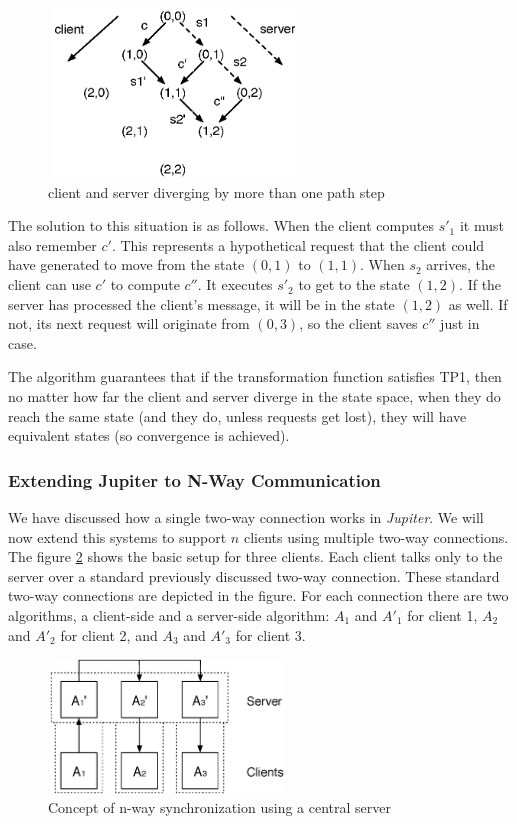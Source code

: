 \begin{figure}[htb]
 \centering
 \includegraphics[width=6.71cm,height=4.5cm]{../images/finalreport/algorithm_statespace2.eps}
 \caption{client and server diverging by more than one path step}
 \label{fig:algorithm.statespace2}
\end{figure}

The solution to this situation is as follows. When the client computes $s'_1$ it 
must also remember $c'$. This represents a hypothetical request that the client 
could have generated to move from the state $(0,1)$ to $(1,1)$. When $s_2$
arrives, the client can use $c'$ to compute $c''$. It executes $s'_2$ to get to 
the state $(1,2)$. If the server has processed the client's message, it will be 
in the state $(1,2)$ as well. If not, its next request will originate from 
$(0,3)$, so the client saves $c''$ just in case.

The algorithm guarantees that if the transformation function satisfies TP1, then 
no matter how far the client and server diverge in the state space, when they do 
reach the same state (and they do, unless requests get lost), they will have 
equivalent states (so convergence is achieved).

\subsubsection{Extending Jupiter to N-Way Communication}
We have discussed how a single two-way connection works in \emph{Jupiter}. We will now extend this systems to support $n$ clients using multiple two-way connections. The figure \ref{fig:algorithm.nway-details} shows the basic setup for three clients. Each client talks only to the server over a standard previously discussed two-way connection. These standard two-way connections
are depicted in the figure. For each connection there are two algorithms,
a client-side and a server-side algorithm:
$A_1$ and $A'_1$ for client 1, $A_2$ and $A'_2$ for client 2, and $A_3$ and
$A'_3$ for client 3. 

\begin{figure}[htb]
 \centering
 \includegraphics[width=6.31cm,height=3.56cm]{../images/finalreport/algorithm_nway-details.eps}
 \caption{Concept of n-way synchronization using a central server}
 \label{fig:algorithm.nway-details}
\end{figure}


